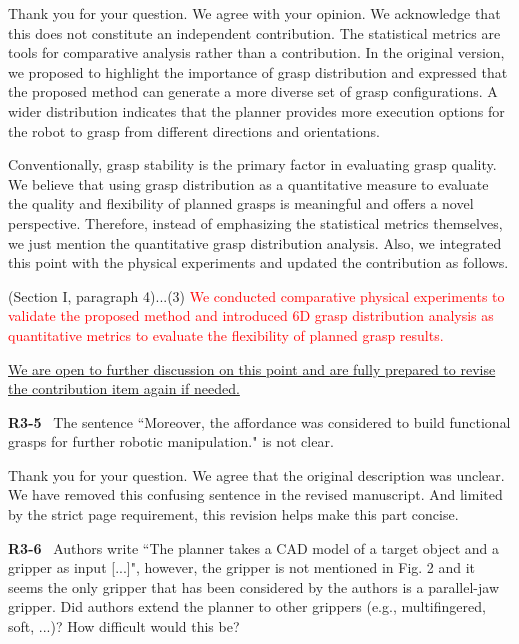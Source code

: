 \documentclass[journal]{IEEEtran}
\newcommand{\rev}[1]{\textcolor{red}{#1}}
\begin{document}
Thank you for your question. We agree with your opinion. We acknowledge that this does not constitute an independent contribution. The statistical metrics are tools for comparative analysis rather than a contribution. In the original version, we proposed to highlight the importance of grasp distribution and expressed that the proposed method can generate a more diverse set of grasp configurations. A wider distribution indicates that the planner provides more execution options for the robot to grasp from different directions and orientations.

Conventionally, grasp stability is the primary factor in evaluating grasp quality. We believe that using grasp distribution as a quantitative measure to evaluate the quality and flexibility of planned grasps is meaningful and offers a novel perspective. Therefore, instead of emphasizing the statistical metrics themselves, we just mention the quantitative grasp distribution analysis. Also, we integrated this point with the physical experiments and updated the contribution as follows. 

(Section I, paragraph 4)...(3)
\rev{We conducted comparative physical experiments to validate the proposed method and introduced 6D grasp distribution analysis as quantitative metrics to evaluate the flexibility of planned grasp results.}

\uline{We are open to further discussion on this point and are fully prepared to revise the contribution item again if needed.}


\bigskip

\noindent
{\textbf{\color{black}R3-5}\color{gray}~
The sentence ``Moreover, the affordance was considered to build functional grasps for further robotic manipulation." is not clear.
}

Thank you for your question. We agree that the original description was unclear. We have removed this confusing sentence in the revised manuscript. And limited by the strict page requirement, this revision helps make this part concise. 

\bigskip

\noindent
{\textbf{\color{black}R3-6}\color{gray}~
Authors write ``The planner takes a CAD model of a target object and a gripper as input [...]", however, the gripper is not mentioned in Fig. 2 and it seems the only gripper that has been considered by the authors is a parallel-jaw gripper. Did authors extend the planner to other grippers (e.g., multifingered, soft, ...)? How difficult would this be?}
\end{document}
